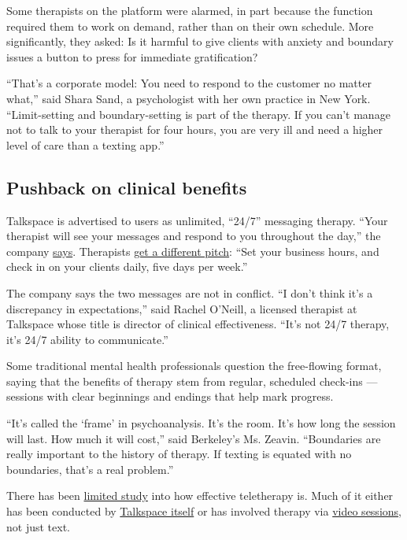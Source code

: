 Some therapists on the platform were alarmed, in part because the
function required them to work on demand, rather than on their own
schedule. More significantly, they asked: Is it harmful to give clients
with anxiety and boundary issues a button to press for immediate
gratification?

``That's a corporate model: You need to respond to the customer no
matter what,'' said Shara Sand, a psychologist with her own practice in
New York. ``Limit-setting and boundary-setting is part of the therapy.
If you can't manage not to talk to your therapist for four hours, you
are very ill and need a higher level of care than a texting app.''

\hypertarget{pushback-on-clinical-benefits}{%
\subsection{Pushback on clinical
benefits}\label{pushback-on-clinical-benefits}}

Talkspace is advertised to users as unlimited, ``24/7'' messaging
therapy. ``Your therapist will see your messages and respond to you
throughout the day,'' the company
\href{https://www.talkspace.com/online-therapy/unlimited-messaging-therapy/}{says}.
Therapists \href{https://www.talkspace.com/join-as-a-therapist}{get a
different pitch}: ``Set your business hours, and check in on your
clients daily, five days per week.''

The company says the two messages are not in conflict. ``I don't think
it's a discrepancy in expectations,'' said Rachel O'Neill, a licensed
therapist at Talkspace whose title is director of clinical
effectiveness. ``It's not 24/7 therapy, it's 24/7 ability to
communicate.''

Some traditional mental health professionals question the free-flowing
format, saying that the benefits of therapy stem from regular, scheduled
check-ins --- sessions with clear beginnings and endings that help mark
progress.

``It's called the `frame' in psychoanalysis. It's the room. It's how
long the session will last. How much it will cost,'' said Berkeley's Ms.
Zeavin. ``Boundaries are really important to the history of therapy. If
texting is equated with no boundaries, that's a real problem.''

There has been
\href{https://www.nytimes3xbfgragh.onion/wirecutter/blog/text-therapy/}{limited
study} into how effective teletherapy is. Much of it either has been
conducted by
\href{https://www.researchgate.net/publication/326003323_The_Effect_of_Messaging_Therapy_for_Depression_and_Anxiety_on_Employee_Productivity}{Talkspace
itself} or has involved therapy via
\href{https://pubmed.ncbi.nlm.nih.gov/26864655/}{video sessions}, not
just text.

